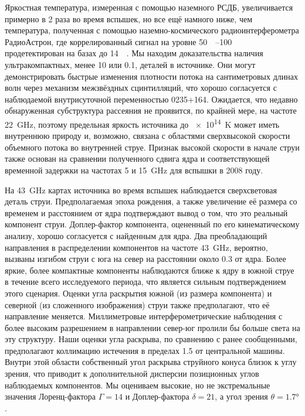 Яркостная температура, измеренная с помощью наземного РСДБ, увеличивается примерно в 2 раза
во время вспышек, но все ещё намного ниже, чем температура, полученная с помощью
наземно-космического радиоинтерферометра РадиоАстрон, где коррелированный сигнал на уровне
\SIrange{50}{100}{\milli\jansky} продетектирован на базах до \SI{14}{\giga\la}. Мы находим
доказательства наличия ультракомпактных, менее \SI{10}{\uas} или \SI{0.1}{\parsec}, деталей в
источнике. Они могут демонстрировать быстрые изменения плотности потока на сантиметровых длинах
волн через механизм межзвёздных сцинтилляций, что хорошо согласуется с наблюдаемой внутрисуточной
переменностью 0235+164. Ожидается, что недавно обнаруженная субструктура рассеяния не
проявится, по крайней мере, на частоте \SI{22}{\GHz}, поэтому предельная яркость источника до
\SI{e14}{\kelvin} может иметь внутреннюю природу и, возможно, связана с областями сверхвысокой
скорости объемного потока во внутренней струе. Признак высокой скорости в начале струи также
основан на сравнении полученного сдвига ядра и соответствующей временной задержки на
частотах 5 и \SI{15}{\GHz} для вспышки в 2008 году.

На \SI{43}{\GHz} картах источника во время вспышек наблюдается сверхсветовая деталь струи.
Предполагаемая эпоха рождения, а также увеличение её размера со временем и расстоянием от ядра
подтверждают вывод о том, что это реальный компонент струи. Доплер-фактор компонента,
оцененный по его кинематическому анализу, хорошо согласуется с найденным для ядра. Два
преобладающий направления в распределении компонентов на частоте \SI{43}{\GHz}, вероятно, вызваны
изгибом струи с юга на север на расстоянии около \SI{0.3}{\mas} от ядра. Более яркие, более
компактные компоненты наблюдаются ближе к ядру в южной струе в течение всего исследуемого периода,
что является сильным подтверждением этого сценария. Оценки угла раскрытия южной (из размера
компонента) и северной (из сложенного изображения) струи также предполагают, что её направление
меняется. Миллиметровые интерферометрические наблюдения с более высоким разрешением в направлении
север-юг пролили бы больше света на эту структуру. Наши оценки угла раскрыва, по сравнению с ранее
сообщенными, предполагают коллимацию истечения в пределах \SI{1.5}{\mas} от центральной машины.
Внутри этой области собственный угол раскрыва струйного конуса близок к углу зрения, что приводит
к дополнительной дисперсии позиционных углов наблюдаемых компонентов. Мы оцениваем высокие, но не
экстремальные значения Лоренц-фактора $\Gamma = 14$ и Доплер-фактора $\delta = 21$, а угол
зрения $\theta = \ang{1.7}$.

